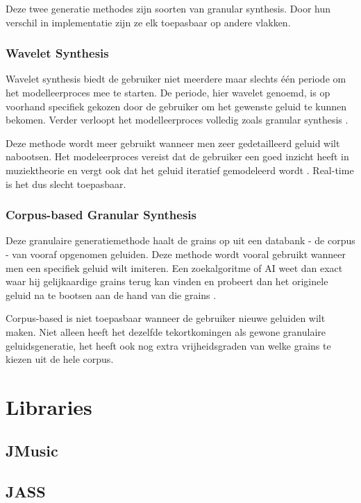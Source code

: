 Deze twee generatie methodes zijn soorten van granular synthesis. Door hun verschil in implementatie zijn ze elk toepasbaar op andere vlakken.

\subsubsection{Wavelet Synthesis}

Wavelet synthesis biedt de gebruiker niet meerdere maar slechts één periode om het modelleerproces mee te starten. De periode, hier wavelet genoemd, is op voorhand specifiek gekozen door de gebruiker om het gewenste geluid te kunnen bekomen. Verder verloopt het modelleerproces volledig zoals granular synthesis \autocite{wavelet}.

Deze methode wordt meer gebruikt wanneer men zeer gedetailleerd geluid wilt nabootsen. Het modeleerproces vereist dat de gebruiker een goed inzicht heeft in muziektheorie en vergt ook dat het geluid iteratief gemodeleerd wordt 
\autocite{wavelet}. Real-time is het dus slecht toepasbaar.

\subsubsection{Corpus-based Granular Synthesis}

Deze granulaire generatiemethode haalt de grains op uit een databank - de corpus - van vooraf opgenomen geluiden. Deze methode wordt vooral gebruikt wanneer men een specifiek geluid wilt imiteren. Een zoekalgoritme of AI weet dan exact waar hij gelijkaardige grains terug kan vinden en probeert dan het originele geluid na te bootsen aan de hand van die grains 
\autocite{methodes}.

Corpus-based is niet toepasbaar wanneer de gebruiker nieuwe geluiden wilt maken. Niet alleen heeft het dezelfde tekortkomingen als gewone granulaire geluidsgeneratie, het heeft ook nog extra vrijheidsgraden van welke grains te kiezen uit de hele corpus.

\section{Libraries}

\subsection{JMusic}

\subsection{JASS}

